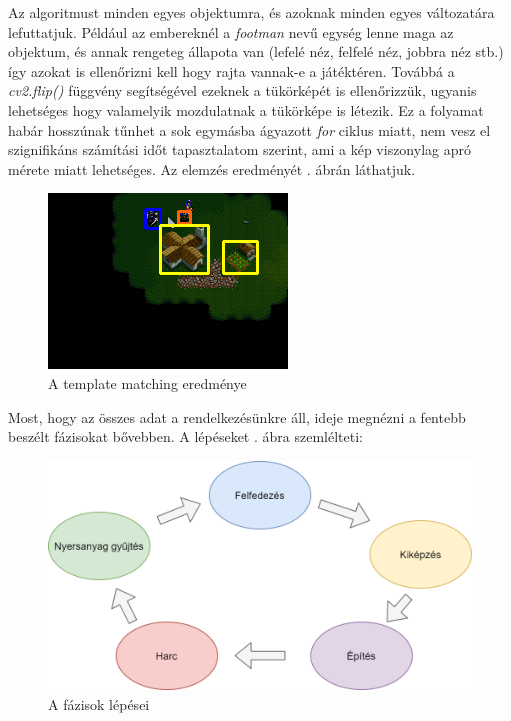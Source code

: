 Az algoritmust minden egyes objektumra, és azoknak minden egyes változatára lefuttatjuk. Például az embereknél a \textit{footman} nevű egység lenne maga az objektum, és annak rengeteg állapota van (lefelé néz, felfelé néz, jobbra néz stb.) így azokat is ellenőrizni kell hogy rajta vannak-e a játéktéren. Továbbá a \textit{cv2.flip()} függvény
segítségével ezeknek a tükörképét is ellenőrizzük, ugyanis lehetséges hogy valamelyik mozdulatnak a tükörképe is létezik. Ez a folyamat habár hosszúnak tűnhet a sok egymásba ágyazott \textit{for} ciklus miatt, nem vesz el szignifikáns számítási időt tapasztalatom szerint, ami a kép viszonylag apró mérete miatt lehetséges. Az elemzés eredményét . ábrán láthatjuk.

\begin{figure}[h]
    \centering
    \includegraphics[scale=1]{images/res.png}
    \caption{A template matching eredménye}
    \label{fig:template}
\end{figure}
\pagebreak
Most, hogy az összes adat a rendelkezésünkre áll, ideje megnézni a fentebb beszélt fázisokat bővebben.
A lépéseket . ábra szemlélteti:

\begin{figure}[h]
    \centering
    \includegraphics[scale=0.4]{images/phases.png}
    \caption{A fázisok lépései}
    \label{fig:phases}
\end{figure}

